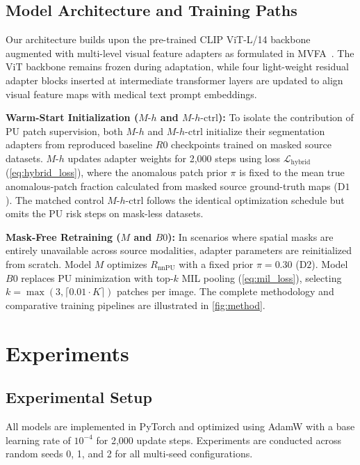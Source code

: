 \documentclass[10pt,twocolumn,letterpaper]{article}
\begin{document}
\subsection{Model Architecture and Training Paths}
Our architecture builds upon the pre-trained CLIP ViT-L/14 backbone~\cite{clip2021} augmented with multi-level visual feature adapters as formulated in MVFA~\cite{huang2024mvfa}. The ViT backbone remains frozen during adaptation, while four light-weight residual adapter blocks inserted at intermediate transformer layers are updated to align visual feature maps with medical text prompt embeddings.

\noindent\textbf{Warm-Start Initialization ($M\text{-}h$ and $M\text{-}h\text{-ctrl}$):} To isolate the contribution of PU patch supervision, both $M\text{-}h$ and $M\text{-}h\text{-ctrl}$ initialize their segmentation adapters from reproduced baseline $R0$ checkpoints trained on masked source datasets. $M\text{-}h$ updates adapter weights for 2,000 steps using loss $\mathcal{L}_{\text{hybrid}}$ (\cref{eq:hybrid_loss}), where the anomalous patch prior $\pi$ is fixed to the mean true anomalous-patch fraction calculated from masked source ground-truth maps ($\text{D1}$). The matched control $M\text{-}h\text{-ctrl}$ follows the identical optimization schedule but omits the PU risk steps on mask-less datasets.

\noindent\textbf{Mask-Free Retraining ($M$ and $B0$):} In scenarios where spatial masks are entirely unavailable across source modalities, adapter parameters are reinitialized from scratch. Model $M$ optimizes $R_{\text{nnPU}}$ with a fixed prior $\pi = 0.30$ ($\text{D2}$). Model $B0$ replaces PU minimization with top-$k$ MIL pooling (\cref{eq:mil_loss}), selecting $k = \max(3, \lceil 0.01 \cdot K \rceil)$ patches per image. The complete methodology and comparative training pipelines are illustrated in \cref{fig:method}.

\section{Experiments}
\label{sec:experiments}

\subsection{Experimental Setup}
All models are implemented in PyTorch and optimized using AdamW with a base learning rate of $10^{-4}$ for 2,000 update steps. Experiments are conducted across random seeds 0, 1, and 2 for all multi-seed configurations.
\end{document}
